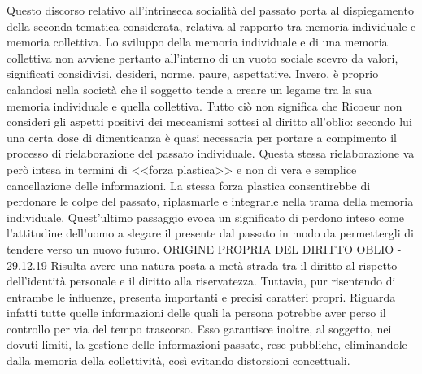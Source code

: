 Questo discorso relativo all'intrinseca socialità del passato porta al dispiegamento della seconda tematica considerata, relativa al rapporto tra memoria individuale e memoria collettiva.
Lo sviluppo della memoria individuale e di una memoria collettiva non avviene pertanto all'interno di un vuoto sociale scevro da valori, significati considivisi, desideri, norme, paure, aspettative. Invero, è proprio calandosi nella società che il soggetto tende a creare un legame tra la sua memoria individuale e quella collettiva. Tutto ciò non significa che Ricoeur non consideri gli aspetti positivi dei meccanismi sottesi al diritto all'oblio: secondo lui una certa dose di dimenticanza è quasi necessaria per portare  a compimento il processo di rielaborazione del passato individuale. Questa stessa rielaborazione va però intesa in termini di <<forza plastica>> e non di vera e semplice cancellazione delle informazioni. La stessa forza plastica consentirebbe di perdonare le colpe del passato, riplasmarle e integrarle nella trama della memoria individuale. Quest'ultimo passaggio evoca un significato di perdono inteso come l'attitudine dell'uomo a slegare il presente dal passato in modo da permettergli di tendere verso un nuovo futuro.
{ORIGINE PROPRIA DEL DIRITTO OBLIO - 29.12.19}
Risulta avere una natura posta a metà strada tra il diritto al rispetto dell'identità personale e il diritto alla riservatezza. Tuttavia, pur risentendo di entrambe le influenze, presenta importanti e precisi caratteri propri.
Riguarda infatti tutte quelle informazioni delle quali la persona potrebbe aver perso il controllo per via del tempo trascorso. Esso garantisce inoltre, al soggetto, nei dovuti limiti, la gestione delle informazioni passate, rese pubbliche, eliminandole dalla memoria della collettività, così evitando distorsioni concettuali.

